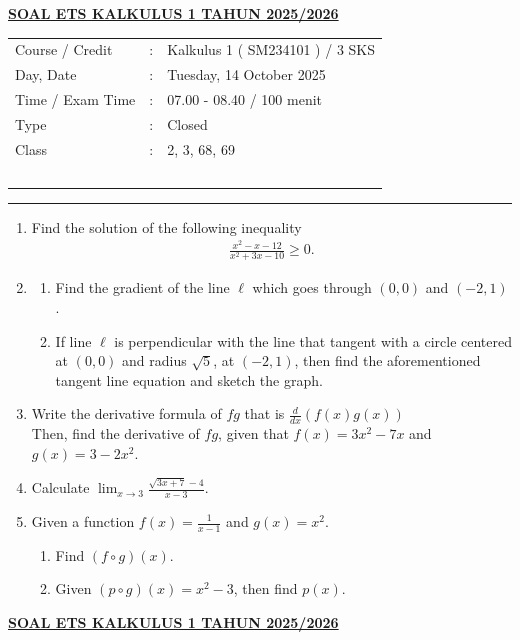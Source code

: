 \documentclass[10pt,openany,a4paper]{article}
\theoremstyle{definition}
\theoremstyle{definition}
\theoremstyle{plain}
\begin{document}
\newpage
 \begin{center}
	{\underline{\textbf{\MakeUppercase{Soal ETS Kalkulus 1 Tahun 2025/2026}}}}
    \end{center}

    \begin{center}
	\begin{tabular}{lcl}
		Course / Credit & : & Kalkulus 1 ( SM234101 ) / 3 SKS\\
		Day, Date & : & Tuesday, 14 October 2025\\
		Time / Exam Time & : & 07.00 - 08.40 / 100 menit\\
		Type & : & Closed\\
		Class & : & 2, 3, 68, 69\\
  ~
	\end{tabular}
    
    \noindent\rule{\textwidth}{2.pt}
        \end{center}
        \begin{enumerate}
            \item Find the solution of the following inequality 
            \begin{align*}
                \frac{x^2-x-12}{x^2+3x-10}\geq 0.
            \end{align*}
            \item \begin{enumerate}
                \item Find the gradient of the line $\ell$ which goes through $(0,0)$ and $(-2,1)$.
                \item If line $\ell$ is perpendicular with the line that tangent with a circle centered at $(0,0)$ and radius $\sqrt{5}$, at $(-2,1)$, then find the aforementioned tangent line equation and sketch the graph. 
            \end{enumerate}
            \item Write the derivative formula of $fg$ that is $\frac{d}{dx}(f(x)g(x))$\\
            Then, find the derivative of $fg$, given that $f(x)=3x^2-7x$ and $g(x)=3-2x^2$.
            \item Calculate $\displaystyle \lim_{x\to 3} \frac{\sqrt{3x+7}-4}{x-3}$.
            \item Given a function $f(x)=\frac{1}{x-1}$ and $g(x)=x^2$. 
            \begin{enumerate}
                \item Find $(f\circ g)(x)$.
                \item Given $(p\circ g)(x)=  x^2-3$, then find $p(x)$.
            \end{enumerate}
        \end{enumerate}
               \newpage
 \begin{center}
	{\underline{\textbf{\MakeUppercase{Soal ETS Kalkulus 1 Tahun 2025/2026}}}}
    \end{center}
\end{document}

